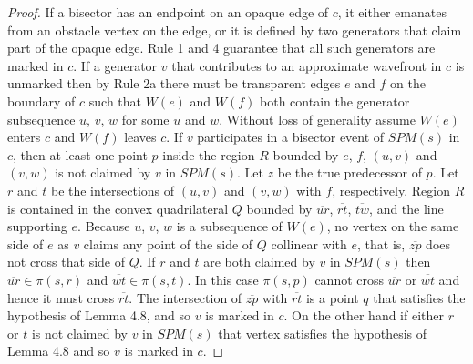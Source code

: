 \begin{proof}
	If a bisector has an endpoint on an opaque edge of $c$, it either
	emanates from an obstacle vertex on the edge, or it is defined by two
	generators that claim part of the opaque edge. Rule 1 and 4 guarantee
	that all such generators are marked in $c$.
	If a generator $v$ that contributes to an approximate wavefront in $c$ is
	unmarked then by Rule 2a there must be transparent edges $e$ and $f$ on
	the boundary of $c$ such that $W(e)$ and $W(f)$ both contain the
	generator subsequence $u$, $v$, $w$ for some $u$ and $w$.
	Without loss of generality assume $W(e)$ enters $c$ and $W(f)$ leaves
	$c$. If $v$ participates in a bisector event of $SPM(s)$ in $c$, then at
	least one point $p$ inside the region $R$ bounded by $e$, $f$, $(u,v)$
	and $(v,w)$ is not claimed by $v$ in $SPM(s)$. Let $z$ be the true
	predecessor of $p$. Let $r$ and $t$ be the intersections of $(u,v)$ and
	$(v,w)$ with $f$, respectively. Region $R$ is contained in the convex
	quadrilateral $Q$ bounded by $\overline{ur}$, $\overline{rt}$,
	$\overline{tw}$, and the line supporting $e$. Because $u$, $v$, $w$ is a
	subsequence of $W(e)$, no vertex on the same side of $e$ as $v$ claims
	any point of the side of $Q$ collinear with $e$, that is, $\overline{zp}$
	does not cross that side of $Q$. If $r$ and $t$ are both claimed by $v$
	in $SPM(s)$ then $\overline{ur}\in \pi(s,r)$ and $\overline{wt}\in
	\pi(s,t)$. In this case $\pi(s,p)$ cannot cross $\overline{ur}$ or
	$\overline{wt}$ and hence it
	must cross $\overline{rt}$. The intersection of $\overline{zp}$ with
	$\overline{rt}$ is a point $q$ that satisfies the hypothesis of Lemma 4.8,
	and so $v$ is marked in $c$. On the other hand if either $r$ or $t$ is not
	claimed by $v$ in $SPM(s)$ that vertex satisfies the hypothesis of Lemma 4.8
	and so $v$ is marked in $c$.
\end{proof}


